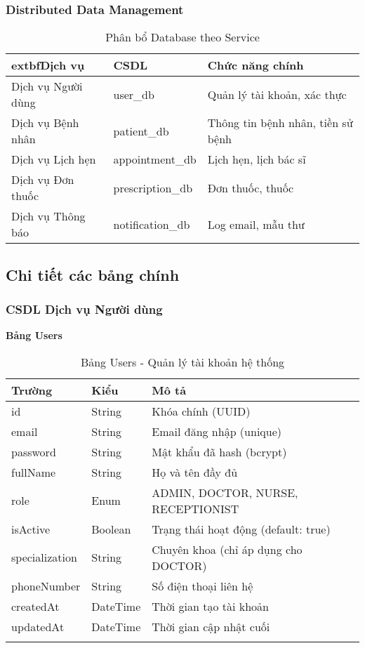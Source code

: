 \documentclass[12pt,a4paper]{report}
\begin{document}
    \subsubsection{Distributed Data Management}
    \begin{table}[h]
    \centering
    \caption{Phân bổ Database theo Service}
    \begin{tabular}{|l|l|l|}
    \hline
    	extbf{Dịch vụ} & \textbf{CSDL} & \textbf{Chức năng chính} \\
    \hline
    Dịch vụ Người dùng & user\_db & Quản lý tài khoản, xác thực \\
    \hline
    Dịch vụ Bệnh nhân & patient\_db & Thông tin bệnh nhân, tiền sử bệnh \\
    \hline
    Dịch vụ Lịch hẹn & appointment\_db & Lịch hẹn, lịch bác sĩ \\
    \hline
    Dịch vụ Đơn thuốc & prescription\_db & Đơn thuốc, thuốc \\
    \hline
    Dịch vụ Thông báo & notification\_db & Log email, mẫu thư \\
    \hline
    \end{tabular}
    \end{table}

    \subsection{Chi tiết các bảng chính}

    \subsubsection{CSDL Dịch vụ Người dùng}
    \textbf{Bảng Users}
    \begin{longtable}{|p{3cm}|p{2cm}|p{8cm}|}
    \hline
    \textbf{Trường} & \textbf{Kiểu} & \textbf{Mô tả} \\
    \hline
    id & String & Khóa chính (UUID) \\
    \hline
    email & String & Email đăng nhập (unique) \\
    \hline
    password & String & Mật khẩu đã hash (bcrypt) \\
    \hline
    fullName & String & Họ và tên đầy đủ \\
    \hline
    role & Enum & ADMIN, DOCTOR, NURSE, RECEPTIONIST \\
    \hline
    isActive & Boolean & Trạng thái hoạt động (default: true) \\
    \hline
    specialization & String & Chuyên khoa (chỉ áp dụng cho DOCTOR) \\
    \hline
    phoneNumber & String & Số điện thoại liên hệ \\
    \hline
    createdAt & DateTime & Thời gian tạo tài khoản \\
    \hline
    updatedAt & DateTime & Thời gian cập nhật cuối \\
    \hline
    \caption{Bảng Users - Quản lý tài khoản hệ thống}
    \end{longtable}
\end{document}
